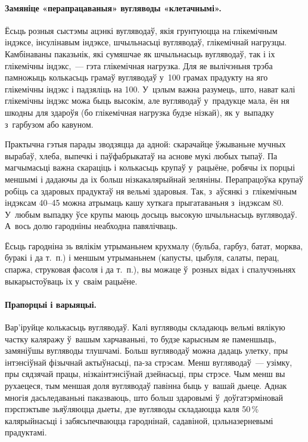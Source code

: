 \paragraph{Замяніце «перапрацаваныя» вугляводы «клетачнымі».}
Ёсьць розныя сыстэмы ацэнкі вугляводаў, якія грунтуюцца на глікемічным індэксе, інсулінавым індэксе, шчыльнасьці вугляводаў, глікемічнай нагрузцы. Камбінаваны паказьнік, які сумяшчае як шчыльнасьць вугляводаў, так і іх глікемічны індэкс,~--- гэта глікемічная нагрузка. Для яе вылічэньня трэба памножыць колькасьць грамаў вугляводаў у~100 грамах прадукту на яго глікемічны індэкс і падзяліць на 100. У~цэлым важна разумець, што, нават калі глікемічны індэкс можа быць высокім, але вугляводаў у~прадукце мала, ён ня шкодны для здароўя (бо глікемічная нагрузка будзе нізкай), як у~выпадку з~гарбузом або кавуном.


Практычна гэтыя парады зводзяцца да адной: скарачайце ўжываньне мучных вырабаў, хлеба, выпечкі і паўфабрыкатаў на аснове мукі любых тыпаў. Па магчымасьці важна скараціць і колькасьць крупаў у~рацыёне, робячы іх порцыі меншымі і дадаючы да іх больш нізкакалярыйнай зеляніны. Перапрацоўка крупаў робіць са здаровых прадуктаў ня вельмі здаровыя. Так, з~аўсянкі з~глікемічным індэксам 40--45 можна атрымаць кашу хуткага прыгатаваньня з~індэксам 80. У~любым выпадку ўсе крупы маюць досыць высокую шчыльнасьць вугляводаў. А~вось долю гародніны неабходна павялічваць.

Ёсьць гародніна зь вялікім утрыманьнем крухмалу (бульба, гарбуз, батат, морква, буракі і да т.~п.) і меншым утрыманьнем (капусты, цыбуля, салаты, перац, спаржа, струковая фасоля і да т.~п.), вы можаце ў~розных відах і спалучэньнях выкарыстоўваць іх у~сваім рацыёне.

\paragraph{Прапорцыі і варыяцыі.}

Вар'іруйце колькасьць вугляводаў. Калі вугляводы складаюць вельмі вялікую частку каляражу ў~вашым харчаваньні, то будзе карысным яе паменшыць, замяніўшы вугляводы тлушчамі. Больш вугляводаў можна дадаць улетку, пры інтэнсіўнай фізычнай актыўнасьці, па-за стрэсам. Менш вугляводаў~--- узімку, пры сядзячай працы, нізкаінтэнсіўнай дзейнасьці, пры стрэсе. Чым менш вы рухаецеся, тым меншая доля вугляводаў павінна быць у~вашай дыеце. Аднак многія дасьледаваньні паказваюць, што больш здаровымі ў~доўгатэрміновай пэрспэктыве зьяўляюцца дыеты, дзе вугляводы складаюцца каля 50\,\% калярыйнасьці і забясьпечваюцца гароднінай, садавіной, цэльназерневымі прадуктамі.


